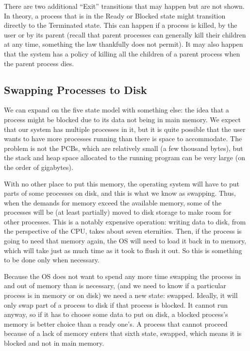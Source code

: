 There are two additional ``Exit'' transitions that may happen but are not shown. In theory, a process that is in the Ready or Blocked state might transition directly to the Terminated state. This can happen if a process is killed, by the user or by its parent (recall that parent processes can generally kill their children at any time, something the law thankfully does not permit). It may also happen that the system has a policy of killing all the children of a parent process when the parent process dies.

\subsection*{Swapping Processes to Disk}
We can expand on the five state model with something else: the idea that a process might be blocked due to its data not being in main memory. We expect that our system has multiple processes in it, but it is quite possible that the user wants to have more processes running than there is space to accommodate. The problem is not the PCBs, which are relatively small (a few thousand bytes), but the stack and heap space allocated to the running program can be very large (on the order of gigabytes).

With no other place to put this memory, the operating system will have to put parts of some processes on disk, and this is what we know as swapping. Thus, when the demands for memory exceed the available memory, some of the processes will be (at least partially) moved to disk storage to make room for other processes. This is a notably expensive operation: writing data to disk, from the perspective of the CPU, takes about seven eternities. Then, if the process is going to need that memory again, the OS will need to load it back in to memory, which will take just as much time as it took to flush it out. So this is something to be done only when necessary.

Because the OS does not want to spend any more time swapping the process in and out of memory than is necessary, (and we need to know if a particular process is in memory or on disk) we need a new state: swapped.  Ideally, it will only swap part of a process to disk if that process is blocked. It cannot run anyway, so if it has to choose some data to put on disk, a blocked process's memory is better choice than a ready one's. A process that cannot proceed because of a lack of memory enters that sixth state, swapped, which means it is blocked and not in main memory.

